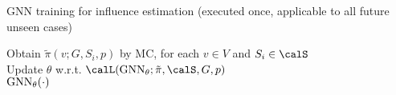 \begin{algorithm}[t]
    \caption{{GNN training for influence estimation (executed once, applicable to all future unseen cases)}} \label{algo:gnn}
    {Obtain} $\tilde{\pi}(v; G, S_i, p)$ by MC, for each $v \in V$ and $S_i \in \calS$ \label{algo:gnn:inf_MC}\\ %
    Update $\theta$ w.r.t. $\calL(\GNN_{\theta}; \tilde{\pi}, \calS, G, p)$ %
    \label{algo:gnn:update_param} \\
 \Return $\operatorname{GNN}_{\theta}(\cdot)$ \label{algo:gnn:return}  
\end{algorithm}